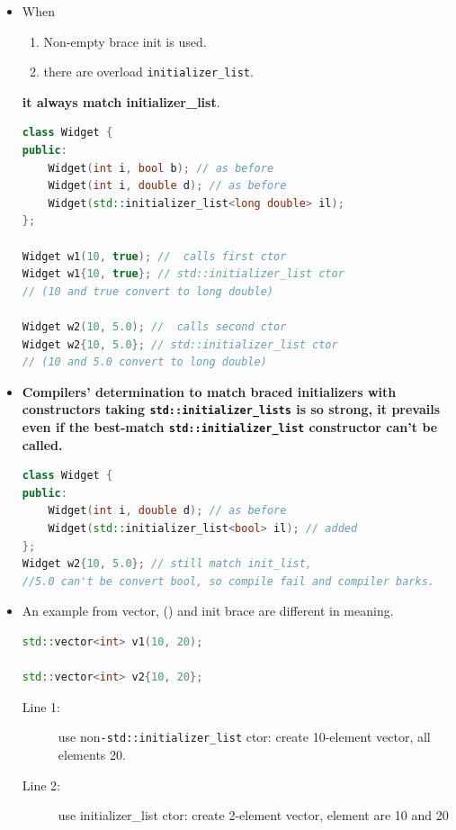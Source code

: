 \documentclass[a4paper,11pt,twoside]{book}
\begin{document}
\begin{itemize}

	\item When 
	\begin{enumerate}
		\item Non-empty brace init is used.
		\item there are overload \texttt{initializer\_list}.
	\end{enumerate}
	\textbf{it always match initializer\_list}.
\begin{lstlisting}[frame=single, language=c++,mathescape=true]
class Widget {
public:
	Widget(int i, bool b); // as before
	Widget(int i, double d); // as before
	Widget(std::initializer_list<long double> il);
};
	
Widget w1(10, true); //  calls first ctor
Widget w1{10, true}; // std::initializer_list ctor
// (10 and true convert to long double)

Widget w2(10, 5.0); //  calls second ctor
Widget w2{10, 5.0}; // std::initializer_list ctor
// (10 and 5.0 convert to long double)
\end{lstlisting}
	
	\item \textbf{ Compilers' determination to match braced initializers with constructors taking \texttt{std::initializer\_lists} is so strong, it prevails even if the best-match \texttt{std::initializer\_list} constructor can't be called.}
\begin{lstlisting}[frame=single, language=c++,mathescape=true]
class Widget {
public:
	Widget(int i, double d); // as before
	Widget(std::initializer_list<bool> il); // added
};
Widget w2{10, 5.0}; // still match init_list,
//5.0 can't be convert bool, so compile fail and compiler barks.
\end{lstlisting}
	
	\item An example from vector, () and init brace are different in meaning.
\begin{lstlisting}[frame=single, language=c++,mathescape=true]
std::vector<int> v1(10, 20); 
	
std::vector<int> v2{10, 20}; 
\end{lstlisting}
\begin{description}
	\item[Line 1:] use non\texttt{-std::initializer\_list} ctor: create 10-element vector, all elements 20.
	\item[Line 2:] use initializer\_list ctor: create 2-element vector, element are 10 and 20
\end{description}
	

\end{itemize}
\end{document}
